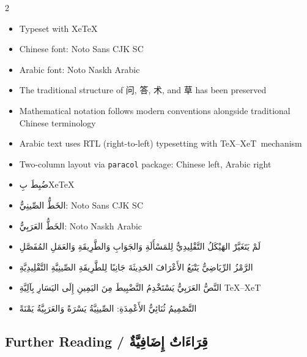 \documentclass[11pt,a4paper]{article}
\newcommand{\ar}[1]{\arabicfont\beginR #1\endR}
\providecommand{\TeXXeT}{TeX--XeT}
\newcommand{\zhtext}[1]{{\chinese #1}}
\newenvironment{bilingual}{%
  \begin{paracol}{2}
}{%
  \end{paracol}
}
\begin{document}
\begin{bilingual}

\begin{leftcolumn*}
\begin{itemize}
  \item Typeset with XeTeX
  \item Chinese font: Noto Sans CJK SC
  \item Arabic font: Noto Naskh Arabic
  \item The traditional structure of \zhtext{问}, \zhtext{答}, \zhtext{术}, and \zhtext{草} has been preserved
  \item Mathematical notation follows modern conventions alongside traditional Chinese terminology
  \item Arabic text uses RTL (right-to-left) typesetting with \TeXXeT\ mechanism
  \item Two-column layout via \texttt{paracol} package: Chinese left, Arabic right
\end{itemize}
\end{leftcolumn*}

\begin{rightcolumn*}
\begin{itemize}
  \item \ar{ضُبِطَ بِXeTeX}
  \item \ar{الخَطُّ الصِّينِيُّ: Noto Sans CJK SC}
  \item \ar{الخَطُّ العَرَبِيُّ: Noto Naskh Arabic}
  \item \ar{لَمْ يَتَغَيَّرْ الهَيْكَلُ التَّقْلِيدِيُّ لِلمَسْأَلَةِ وَالجَوَابِ وَالطَّرِيقَةِ وَالعَمَلِ المُفَصَّلِ}
  \item \ar{الرَّمْزُ الرِّيَاضِيُّ يَتْبَعُ الأَعْرَافَ الحَدِيثَةَ جَانِبًا لِلطَّرِيقَةِ الصِّينِيَّةِ التَّقْلِيدِيَّةِ}
  \item \ar{النَّصُّ العَرَبِيُّ يَسْتَخْدِمُ التَّضْبِيطَ مِنَ اليَمِينِ إِلَى اليَسَارِ بِآلِيَّةِ \TeXXeT}
  \item \ar{التَّصْمِيمُ ثُنَائِيُّ الأَعْمِدَةِ: الصِّينِيَّةُ يَسْرَةً وَالعَرَبِيَّةُ يَمْنَةً}
\end{itemize}
\end{rightcolumn*}

\end{bilingual}

\vspace{1em}

\subsection*{Further Reading / \ar{قِرَاءَاتٌ إِضَافِيَّةٌ}}
\end{document}
